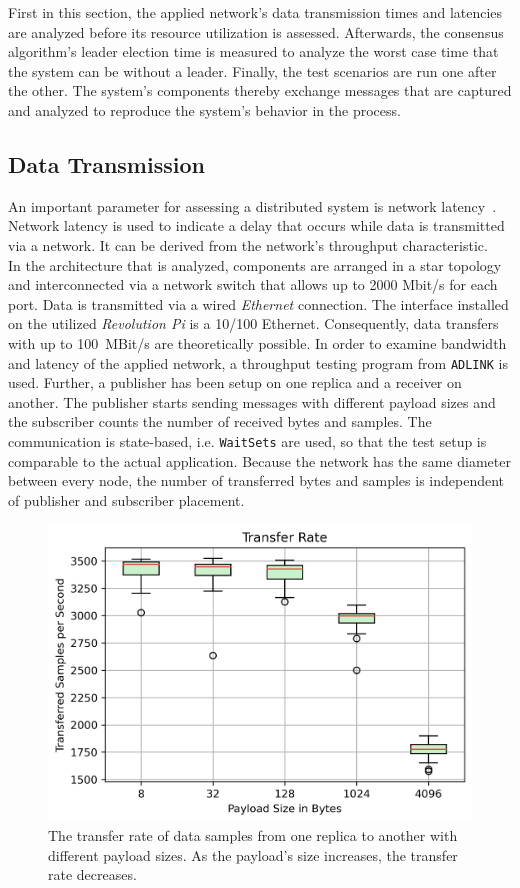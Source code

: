 First in this section, the applied network's data transmission times and latencies are analyzed before its resource utilization is assessed.
Afterwards, the consensus algorithm's leader election time is measured to analyze the worst case time that the system can be without a leader.
Finally, the test scenarios are run one after the other.
The system's components thereby exchange messages that are captured and analyzed to reproduce the system's behavior in the process.

\subsection{Data Transmission}

An important parameter for assessing a distributed system is network latency~\cite{SinhaMeasureNetworkLatency}.
Network latency is used to indicate a delay that occurs while data is transmitted via a network.
It can be derived from the network's throughput characteristic.
\\

In the architecture that is analyzed, components are arranged in a star topology and interconnected via a network switch that allows up to 2000 Mbit/s for each port.
Data is transmitted via a wired \textit{Ethernet} connection.
The interface installed on the utilized \textit{Revolution Pi} is a 10/100 Ethernet.
Consequently, data transfers with up to 100~MBit/s are theoretically possible.
In order to examine bandwidth and latency of the applied network, a  throughput testing program from \texttt{ADLINK} is used.
Further, a publisher has been setup on one replica and a receiver on another.
The publisher starts sending messages with different payload sizes and the subscriber counts the number of received bytes and samples.
The communication is state-based, i.e. \texttt{WaitSets} are used, so that the test setup is comparable to the actual application.
Because the network has the same diameter between every node, the number of transferred bytes and samples is independent of publisher and subscriber placement.

\begin{figure}[!hb]
	\centering
	\includegraphics[width=0.8\linewidth]{images/plots/transferRate}
	\caption{The transfer rate of data samples from one replica to another with different payload sizes. As the payload's size increases, the transfer rate decreases.}
	\label{fig:PlotTransferRate}
\end{figure}

